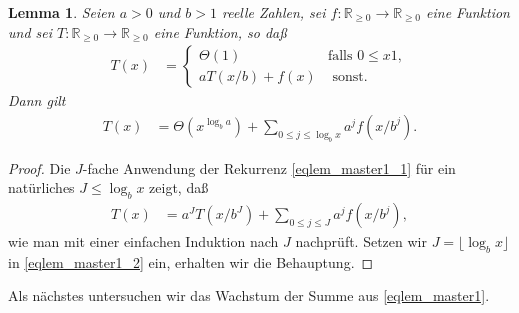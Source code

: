 \documentclass[10pt,reqno]{amsart}
\numberwithin{equation}{section}
\newcommand\RRpos{\mathbb R_{\geq0}}
\newtheorem{lemma}[definition]{Lemma}
\begin{document}
\begin{lemma}\label{lem_master1}
	Seien $a>0$ und $b>1$ reelle Zahlen, sei $f:\RRpos\to\RRpos$ eine Funktion und sei $T:\RRpos\to\RRpos$ eine Funktion, so da\ss
	\begin{align}\label{eqlem_master1_1}
		T(x)&=\begin{cases}\Theta(1)&\mbox{falls }0\leq x1,\\ aT(x/b)+f(x)&\mbox{ sonst.}\end{cases}
	\end{align}
	Dann gilt
	\begin{align}\label{eqlem_master1}
		T(x)&=\Theta(x^{\log_ba})+\sum_{0\leq j\leq\log_bx}a^jf(x/b^j).
	\end{align}
\end{lemma}
\begin{proof}
	Die $J$-fache Anwendung der Rekurrenz \eqref{eqlem_master1_1} f\"ur ein nat\"urliches $J\leq\log_bx$ zeigt, da\ss
	\begin{align}\label{eqlem_master1_2}
		T(x)&=a^J T(x/b^J)+\sum_{0\leq j\leq J}a^jf(x/b^j),
	\end{align}
	wie man mit einer einfachen Induktion nach $J$ nachpr\"uft.	
	Setzen wir $J=\lfloor\log_bx\rfloor$ in \eqref{eqlem_master1_2} ein, erhalten wir die Behauptung.
\end{proof}

Als n\"achstes untersuchen wir das Wachstum der Summe aus \eqref{eqlem_master1}.
\end{document}
